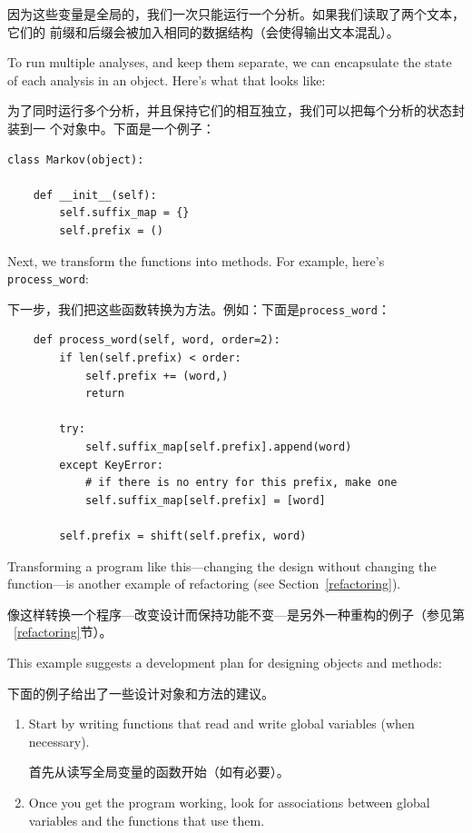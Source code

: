 \documentclass[10pt]{book}
\begin{document}
\begin{CJK}{UTF8}{gbsn}
因为这些变量是全局的，我们一次只能运行一个分析。如果我们读取了两个文本，它们的
前缀和后缀会被加入相同的数据结构（会使得输出文本混乱）。

To run multiple analyses, and keep them separate, we can encapsulate
the state of each analysis in an object.
Here's what that looks like:

为了同时运行多个分析，并且保持它们的相互独立，我们可以把每个分析的状态封装到一
个对象中。下面是一个例子：

\begin{verbatim}
class Markov(object):

    def __init__(self):
        self.suffix_map = {}
        self.prefix = ()    
\end{verbatim}

Next, we transform the functions into methods.  For example,
here's \verb"process_word":

下一步，我们把这些函数转换为方法。例如：下面是\verb"process_word"：

\begin{verbatim}
    def process_word(self, word, order=2):
        if len(self.prefix) < order:
            self.prefix += (word,)
            return

        try:
            self.suffix_map[self.prefix].append(word)
        except KeyError:
            # if there is no entry for this prefix, make one
            self.suffix_map[self.prefix] = [word]

        self.prefix = shift(self.prefix, word)        
\end{verbatim}

Transforming a program like this---changing the design without
changing the function---is another example of refactoring
(see Section~\ref{refactoring}).

像这样转换一个程序---改变设计而保持功能不变---是另外一种重构的例子（参见第
~\ref{refactoring}节）。

This example suggests a development plan for designing objects and
methods:

下面的例子给出了一些设计对象和方法的建议。

\begin{enumerate}

\item Start by writing functions that read and write global
variables (when necessary).

首先从读写全局变量的函数开始（如有必要）。

\item Once you get the program working, look for associations
between global variables and the functions that use them.


\end{enumerate}
\end{CJK}
\end{document}
